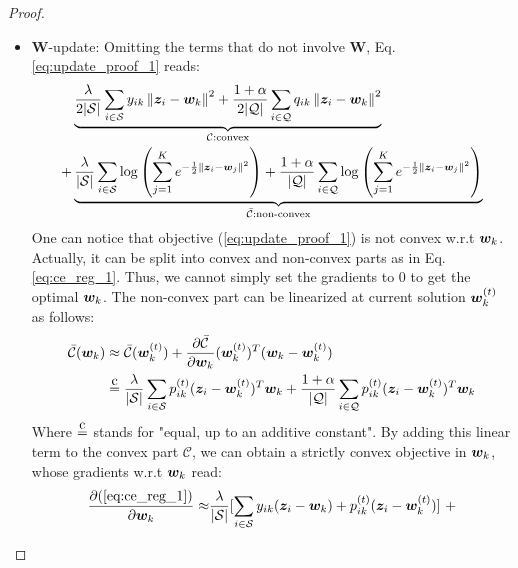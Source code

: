 \documentclass{article}
\newcommand{\ceq}{\stackrel{\mathclap{\normalfont\mbox{c}}}{=}}
\newcommand{\norm}[1]{\left\lVert#1\right\rVert}
\begin{document}
\begin{proof}
            \begin{itemize}
                \item $\mathbf{W}$-update: Omitting the terms that do not involve $\mathbf{W}$, Eq. \eqref{eq:update_proof_1} reads:
    		        \begin{align}
    		            \begin{split}\label{eq:ce_reg_1}
    		            &\underbrace{\frac{\lambda}{2|\mathcal{S}|} \sum_{i \in \mathcal{S}} y_{ik} \norm{\z_i - \w_k}^2 + \frac{1+\alpha}{2|\mathcal{Q}|} \sum_{i \in \mathcal{Q}} q_{ik} \norm{\z_i - \w_k}^2}_{\mathcal{C}: \text{convex}} \\
    		            +& \underbrace{\frac{\lambda}{|\mathcal{S}|} \sum_{i \in \mathcal{S}} \log \left ( \sum_{j=1}^K e^{-\frac{1}{2}\norm{\z_i - \w_j}^2} \right ) + \frac{1+\alpha}{|\mathcal{Q}|} \sum_{i \in \mathcal{Q}} \log \left ( \sum_{j=1}^K e^{-\frac{1}{2}\norm{\z_i - \w_j}^2} \right )}_{\Bar{\mathcal{C}}: \text{non-convex}}
    		            \end{split}
    		        \end{align}
    		        One can notice that objective (\ref{eq:update_proof_1}) is not convex w.r.t $\bm{w}_k$. Actually, it can be split into convex and non-convex parts as in Eq. \eqref{eq:ce_reg_1}. Thus, we cannot simply set the gradients to 0 to get the optimal $\bm{w}_k$. The non-convex part can be linearized at current solution $\bm{w}_k^{(t)}$ as follows:
    		        \begin{align}
    		            \Bar{\mathcal{C}}(\w_k) &\approx
    		            \Bar{\mathcal{C}}(\w_k^{(t)}) + \frac{\partial \Bar{\mathcal{C}}}{\partial \w_k} (\w_k^{(t)})^T (\w_k - \w_k^{(t)}) \nonumber \\
    		            & \ceq \frac{\lambda}{|\mathcal{S}|}\sum_{i \in \mathcal{S}} p_{ik}^{(t)} (\z_i - \w_k^{(t)})^T \w_k + \frac{1+\alpha}{|\mathcal{Q}|}\sum_{i \in \mathcal{Q}} p_{ik}^{(t)} (\z_i - \w_k^{(t)})^T \w_k
    		        \end{align}
    		       Where $\ceq$ stands for "equal, up to an additive constant". By adding this linear term to the convex part $\mathcal{C}$, we can obtain a strictly convex objective in $\bm{w}_k$, whose gradients w.r.t $\bm{w}_k$ read:
    		        \begin{align}
    		            \frac{\partial (\ref{eq:ce_reg_1})}{\partial \w_k} \approx & \frac{\lambda}{|\mathcal{S}|} [\sum_{i \in \mathcal{S}} y_{ik}(\z_i - \w_k) + p_{ik}^{(t)}(\z_i - \w_k^{(t)})] \ + \nonumber \\ 

\end{align}
\end{itemize}
\end{proof}
\end{document}
